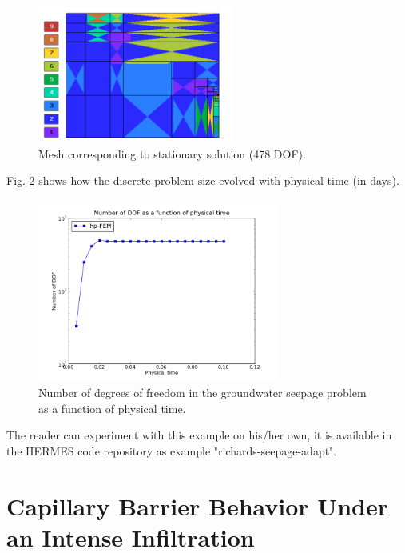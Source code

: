\documentclass[final,3p,times,twocolumn]{elsarticle}
\begin{document}
\begin{figure}[!ht]
\begin{center}
\hspace{6mm}
\includegraphics[height=4.5cm]{see_mesh_4.png}
\end{center}
\vspace{-6mm}
\caption{Mesh corresponding to stationary solution (478 DOF).}
\label{fig:see-mesh-4}
\end{figure}

Fig. \ref{fig:conv-dof_time_2} shows how the discrete problem size 
evolved with physical time (in days). 

\begin{figure}[!ht]
\begin{center}
\includegraphics[height=6cm]{conv_dof_time_2.png}
\end{center}
\vspace{-6mm}
\caption{Number of degrees of freedom in the groundwater seepage problem 
         as a function of physical time.}
\label{fig:conv-dof_time_2}
\end{figure}

The reader can experiment with this example on his/her 
own, it is available in the HERMES code repository \cite{hermes-repo}
as example "richards-seepage-adapt".

\section{Capillary Barrier Behavior Under an Intense Infiltration}
\label{sec:example-barrier}
\end{document}

